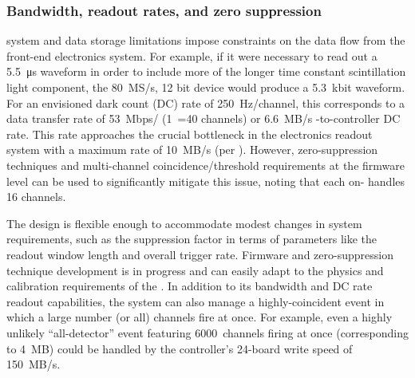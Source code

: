 
 
\subsubsection{Bandwidth, readout rates, and zero suppression}

 system and data storage limitations impose constraints on the  data flow from the front-end electronics system. 
For example, if it were necessary to read out a \SI{5.5}{\micro\second} waveform in order to include more of the longer time constant scintillation light component, the \SI{80}{MS/s}, 12 bit  device would produce a 5.3~kbit waveform. For an envisioned dark count (DC) rate of 250~Hz/channel, this corresponds to a data transfer rate of 53~Mbps/ (1~=40 channels) or 6.6~MB/s -to-controller DC rate. This rate approaches the crucial bottleneck in the electronics readout system with a maximum rate of 10~MB/s  %
(per ). However, zero-suppression techniques and multi-channel coincidence/threshold requirements at the  firmware level can be used to significantly mitigate this issue, noting that each on-  handles 16 channels. 

The design is flexible enough to accommodate modest changes in system requirements, such as the suppression factor in terms of parameters like the readout window length and overall trigger rate. 
Firmware and zero-suppression technique development is in progress and can easily adapt to the physics and calibration requirements of the .
In addition to its bandwidth and DC rate readout capabilities, the system can also  manage a highly-coincident event in which a large number (or all) channels fire at once. For example, even a highly unlikely ``all-detector'' event featuring 6000~channels firing at once (corresponding to 4~MB) could be handled by the controller's 24-board write speed of 150~MB/s. 

